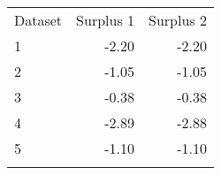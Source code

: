 \begin{tabular}{lrr}
\hline \noalign{\smallskip}Dataset & Surplus 1 & Surplus 2\\
\noalign{\smallskip}\hline \noalign{\smallskip}1 & -2.20 & -2.20\\
2 & -1.05 & -1.05\\
3 & -0.38 & -0.38\\
4 & -2.89 & -2.88\\
5 & -1.10 & -1.10\\
\noalign{\smallskip}\hline\end{tabular}\\
